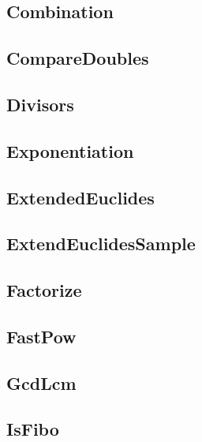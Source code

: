 \subsection{ Combination}
\raggedbottom
\hrulefill
\subsection{ CompareDoubles}
\raggedbottom
\hrulefill
\subsection{ Divisors}
\raggedbottom
\hrulefill
\subsection{ Exponentiation}
\raggedbottom
\hrulefill
\subsection{ ExtendedEuclides}
\raggedbottom
\hrulefill
\subsection{ ExtendEuclidesSample}
\raggedbottom
\hrulefill
\subsection{ Factorize}
\raggedbottom
\hrulefill
\subsection{ FastPow}
\raggedbottom
\hrulefill
\subsection{ GcdLcm}
\raggedbottom
\hrulefill
\subsection{ IsFibo}
\raggedbottom
\hrulefill
